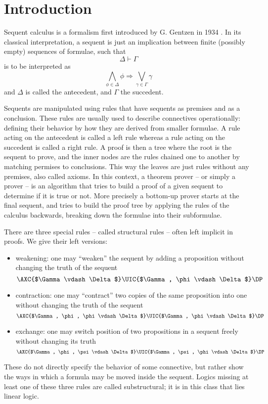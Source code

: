 \chapter{Introduction}\label{chapter:intro}
Sequent calculus is a formalism first introduced by G. Gentzen in 1934 \cite{Gentzen1935I, Gentzen1935II}.
In its classical interpretation, a sequent is just an implication between finite (possibly empty) sequences of formulae, such that
$$ \Delta \vdash \Gamma $$ 
is to be interpreted as
$$ \bigwedge_{\phi \in \Delta} \phi \Rightarrow \bigvee_{\gamma \in \Gamma} \gamma $$
and $\Delta$ is called the antecedent, and $\Gamma$ the succedent.

Sequents are manipulated using rules that have sequents as premises and as a conclusion.
These rules are usually used to describe connectives operationally: defining their behavior by how they are derived from smaller formulae.
A rule acting on the antecedent is called a left rule whereas a rule acting on the succedent is called a right rule.
A proof is then a tree where the root is the sequent to prove, and the inner nodes are the rules chained one to another by matching permises to conclusions.
This way the leaves are just rules without any premises, also called axioms.
In this context, a theorem prover -- or simply a prover -- is an algorithm that tries to build a proof of a given sequent to determine if it is true or not.
More precisely a bottom-up prover starts at the final sequent, and tries to build the proof tree by applying the rules of the calculus backwards, breaking down the formulae into their subformulae.

There are three special rules -- called structural rules -- often left implicit in proofs.
We give their left versions:
\begin{itemize}
	\item weakening: one may ``weaken'' the sequent by adding a proposition without changing the truth of the sequent
		$$
		\AXC{$\Gamma \vdash \Delta$}
		\UIC{$\Gamma, \phi \vdash \Delta$}
		\DP
		$$
	\item contraction: one may ``contract'' two copies of the same proposition into one without changing the truth of the sequent
		$$
		\AXC{$\Gamma, \phi, \phi \vdash \Delta$}
		\UIC{$\Gamma, \phi \vdash \Delta$}
		\DP
		$$
	\item exchange: one may switch position of two propositions in a sequent freely without changing its truth
		$$
		\AXC{$\Gamma, \phi, \psi \vdash \Delta$}
		\UIC{$\Gamma, \psi, \phi \vdash \Delta$}
		\DP
		$$
\end{itemize}
These do not directly specify the behavior of some connective, but rather show the ways in which a formula may be moved inside the sequent.
Logics missing at least one of these three rules are called substructural; it is in this class that lies linear logic.

